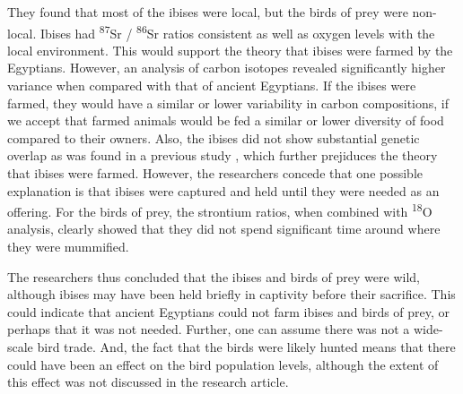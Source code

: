\documentclass[a4paper, 12pt]{article}
\begin{document}
They found that most of the ibises were local, but the birds of prey were non-local.
Ibises had \textsuperscript{87}Sr / \textsuperscript{86}Sr ratios consistent
as well as oxygen levels with the local environment. This would support the theory that
ibises were farmed by the Egyptians. However, an analysis of carbon isotopes revealed
significantly higher variance when compared with that of ancient Egyptians. If the ibises
were farmed, they would have a similar or lower variability in carbon compositions, if we
accept that farmed animals would be fed a similar or lower diversity of food compared to
their owners. Also, the ibises did not show substantial genetic overlap as was found in a previous study \citep{wasef2019}, which
further prejiduces the theory that ibises were farmed. However, the researchers concede
that one possible explanation is that ibises were captured and held until they were
needed as an offering.
For the birds of prey, the strontium ratios, when combined with \textsuperscript{18}O analysis, clearly
showed that they did not spend significant time around where they
were mummified.

The researchers thus concluded that the ibises and birds of prey were wild, although
ibises may have been held briefly in captivity before their sacrifice. This could indicate
that ancient Egyptians could not farm ibises and birds of prey, or perhaps that
it was not needed. Further, one can assume there was not a wide-scale bird trade. And,
the fact that the birds were likely hunted means that there could have been an effect
on the bird population levels, although the extent of this effect was not discussed
in the research article.



\end{document}
